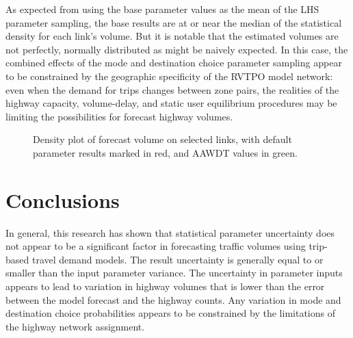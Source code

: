 \documentclass[
  futuretransp,
  submit,
  moreauthors,
]{Definitions/mdpi}
\begin{document}
As expected from using the base parameter values as the mean of the LHS
parameter sampling, the base results are at or near the median of the
statistical density for each link's volume. But it is notable that the
estimated volumes are not perfectly, normally distributed as might be
naively expected. In this case, the combined effects of the mode and
destination choice parameter sampling appear to be constrained by the
geographic specificity of the RVTPO model network: even when the demand
for trips changes between zone pairs, the realities of the highway
capacity, volume-delay, and static user equilibrium procedures may be
limiting the possibilities for forecast highway volumes.

\begin{figure}


\caption{\label{fig-densityplots}Density plot of forecast volume on
selected links, with default parameter results marked in red, and AAWDT
values in green.}

\end{figure}%


\section{Conclusions}\label{sec-conclusions}

In general, this research has shown that statistical parameter
uncertainty does not appear to be a significant factor in forecasting
traffic volumes using trip-based travel demand models. The result
uncertainty is generally equal to or smaller than the input parameter
variance. The uncertainty in parameter inputs appears to lead to
variation in highway volumes that is lower than the error between the
model forecast and the highway counts. Any variation in mode and
destination choice probabilities appears to be constrained by the
limitations of the highway network assignment.
\end{document}
